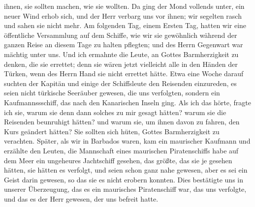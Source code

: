 ihnen, sie sollten machen, wie sie wollten. Da ging der Mond
vollends unter, ein neuer Wind erhob sich, und der Herr verbarg
uns vor ihnen; wir segelten rasch und sahen sie nicht mehr. Am
folgenden Tag, einem Ersten Tag, hatten wir eine öffentliche
Versammlung auf dem Schiffe, wie wir sie gewöhnlich während
der ganzen Reise an diesem Tage zu halten pflegten; und des
Herrn Gegenwart war mächtig unter uns. Und ich ermahnte die
Leute, an Gottes Barmherzigkeit zu denken, die sie errettet; denn
sie wären jetzt vielleicht alle in den Händen der Türken, wenn
des Herrn Hand sie nicht errettet hätte. Etwa eine Woche
darauf suchten der Kapitän und einige der Schiffsleute den
Reisenden einzureden, es seien nicht türkische Seeräuber gewesen,
die uns verfolgten, sondern ein Kaufmannssschiff, das nach den
Kanarischen Inseln ging. Als ich das hörte, fragte ich sie,
warum sie denn dann solches zu mir gesagt hätten? warum sie
die Reisenden beunruhigt hätten? und warum sie, um ihnen
davon zu fahren, den Kurs geändert hätten? Sie sollten sich
hüten, Gottes Barmherzigkeit zu verachten. Später, als wir in
Barbados waren, kam ein maurischer Kaufmann und erzählte den
Leuten, die Mannschaft eines maurischen Piratenschiffs habe auf
dem Meer ein ungeheures Jachtschiff gesehen, das größte, das
sie je gesehen hätten, sie hätten es verfolgt, und seien schon ganz
nahe gewesen, aber es sei ein Geist darin gewesen, so das sie es
nicht erobern konnten. Dies bestätigte uns in unserer Überzeugung,
das es ein maurisches Piratenschiff war, das uns verfolgte, und
das es der Herr gewesen, der uns befreit hatte.

